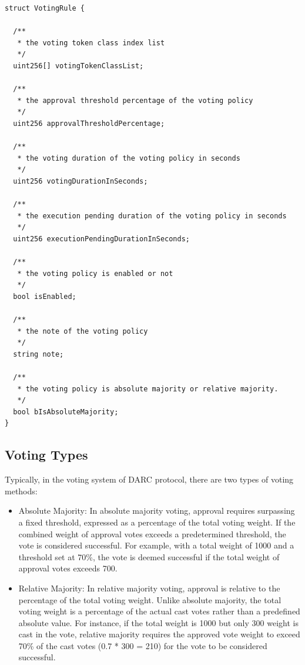 \documentclass[main.tex]{subfiles}
\begin{document}
\begin{verbatim}
struct VotingRule {

  /**
   * the voting token class index list
   */
  uint256[] votingTokenClassList;

  /**
   * the approval threshold percentage of the voting policy
   */
  uint256 approvalThresholdPercentage;

  /**
   * the voting duration of the voting policy in seconds
   */
  uint256 votingDurationInSeconds;

  /**
   * the execution pending duration of the voting policy in seconds
   */
  uint256 executionPendingDurationInSeconds;

  /**
   * the voting policy is enabled or not
   */
  bool isEnabled;

  /**
   * the note of the voting policy
   */
  string note;

  /**
   * the voting policy is absolute majority or relative majority.
   */
  bool bIsAbsoluteMajority;
}
\end{verbatim}


\subsection{Voting Types}

Typically, in the voting system of DARC protocol, there are two types of voting methods:

\begin{itemize}
    \item Absolute Majority: In absolute majority voting, approval requires surpassing a fixed threshold, expressed as a percentage of the total voting weight. If the combined weight of approval votes exceeds a predetermined threshold, the vote is considered successful. For example, with a total weight of 1000 and a threshold set at 70\%, the vote is deemed successful if the total weight of approval votes exceeds 700.

    \item Relative Majority: In relative majority voting, approval is relative to the percentage of the total voting weight. Unlike absolute majority, the total voting weight is a percentage of the actual cast votes rather than a predefined absolute value. For instance, if the total weight is 1000 but only 300 weight is cast in the vote, relative majority requires the approved vote weight to exceed 70\% of the cast votes (0.7 * 300 = 210) for the vote to be considered successful.
\end{itemize}
\end{document}
